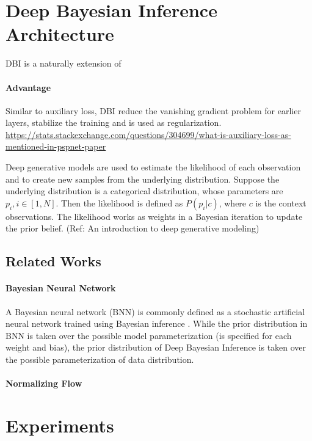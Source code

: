 \documentclass{article}
\begin{document}
\section{Deep Bayesian Inference Architecture}

DBI is a naturally extension of 

\paragraph{Advantage} 
Similar to auxiliary loss, DBI reduce the vanishing gradient problem for earlier layers, stabilize the training and is used as regularization.
\url{https://stats.stackexchange.com/questions/304699/what-is-auxiliary-loss-as-mentioned-in-pspnet-paper}

Deep generative models are used to estimate the likelihood of each observation and to create new samples from the underlying distribution.
Suppose the underlying distribution is a categorical distribution, whose parameters are $p_i, i \in [1, N]$.
Then the likelihood is defined as $P(p_i | c)$, where $c$ is the context observations.
The likelihood works as weights in a Bayesian iteration to update the prior belief.
(Ref: An introduction to deep generative modeling)



\subsection{Related Works}

\paragraph{Bayesian Neural Network}
A Bayesian neural network (BNN) is commonly defined as a stochastic artificial neural network trained using Bayesian inference \citep{jospin2022hands}.
While the prior distribution in BNN is taken over the possible model parameterization (is specified for each weight and bias),
the prior distribution of Deep Bayesian Inference is taken over the possible parameterization of data distribution.

\paragraph{Normalizing Flow}

\section{Experiments}
\end{document}
